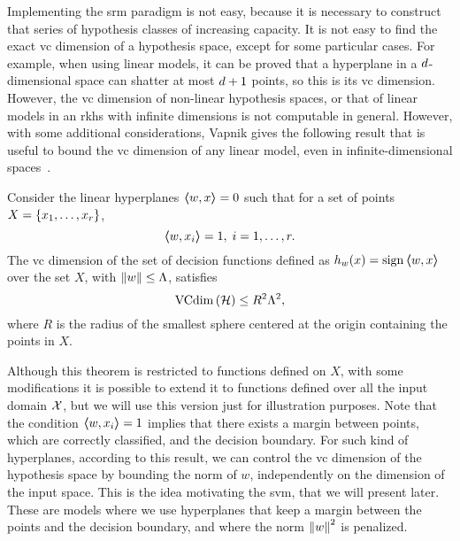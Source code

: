 Implementing the \acrshort{srm} paradigm is not easy, because it is necessary to construct that series of hypothesis classes of increasing capacity. It is not easy to find the exact \acrshort{vc} dimension of a hypothesis space, except for some particular cases.
%
For example, when using linear models, it can be proved that a hyperplane in a $d$-dimensional space can shatter at most $d+1$ points, so this is its \acrshort{vc} dimension.
%
However, the \acrshort{vc} dimension of non-linear hypothesis spaces, or that of linear models in an \acrshort{rkhs} with infinite dimensions is not computable in general.
%
However, with some additional considerations, Vapnik gives the following result that is useful to bound the \acrshort{vc} dimension of any linear model, even in infinite-dimensional spaces~\citep{vapnik1982estimation}.
\begin{theorem}
    Consider the linear hyperplanes $\bm{\left\langle} w, x \bm{\right\rangle} = 0$ such that for a set of points $X = \left\{x_1, \ldots, x_r\right\}$,
    \begin{equation}
        \nonumber
        \bm{\left\langle} w, x_i \bm{\right\rangle} = 1 , \; i=1, \ldots, r.
    \end{equation} 
    The \acrshort{vc} dimension of the set of decision functions defined as $h_w(x) = \operatorname{sign} \bm{\left\langle} w, x \bm{\right\rangle}$ over the set $X$, with $\left\lVert w\right\rVert \leq \Lambda$, satisfies
    \begin{equation}
        \nonumber
        \operatorname{VCdim}\left(\mathcal{H}\right) \leq R^2 \Lambda^2 ,
    \end{equation}
    where $R$ is the radius of the smallest sphere centered at the origin containing the points in $X$.
\end{theorem}
Although this theorem is restricted to functions defined on $X$, with some modifications it is possible to extend it to functions defined over all the input domain $\mathcal{X}$, but we will use this version just for illustration purposes.
%
Note that the condition $\bm{\left\langle} w, x_i \bm{\right\rangle} = 1$ implies that there exists a margin between points, which are correctly classified, and the decision boundary.
%
For such kind of hyperplanes, according to this result, we can control the \acrshort{vc} dimension of the hypothesis space by bounding the norm of $w$, independently on the dimension of the input space.
%
This is the idea motivating the \acrshort{svm}, that we will present later. These are models where we use hyperplanes that keep a margin between the points and the decision boundary, and where the norm $\left\lVert w\right\rVert^2$ is penalized.






